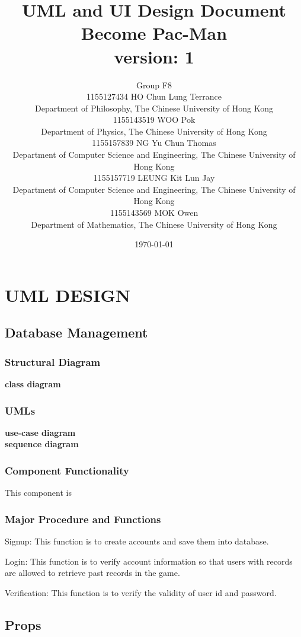 \documentclass[11pt]{article}
\title{UML and UI Design Document\\Become Pac-Man\\version: 1}
\author{Group F8\\1155127434 HO Chun Lung Terrance\\
Department of Philosophy, The Chinese University of Hong Kong\\1155143519 WOO Pok\\
Department of Physics, The Chinese University of Hong Kong\\1155157839 NG Yu Chun Thomas\\
Department of Computer Science and Engineering, The Chinese University of Hong Kong\\1155157719 LEUNG Kit Lun Jay\\
Department of Computer Science and Engineering, The Chinese University of Hong Kong\\1155143569 MOK Owen\\
Department of Mathematics, The Chinese University of Hong Kong}
\date{\today}
\begin{document}
\maketitle
\tableofcontents
\newpage
\section{UML DESIGN}

\subsection{Database Management}
\subsubsection{Structural Diagram}
\textbf{class diagram}\\
\subsubsection{UMLs}
\textbf{use-case diagram}\\
\textbf{sequence diagram}\\
\subsubsection{Component Functionality}
This component is 
\subsubsection{Major Procedure and Functions}
Signup: This function is to create accounts and save them into database.

Login: This function is to verify account information so that users with records are allowed to retrieve past records in the game.

Verification: This function is to verify the validity of user id and password.

\subsection{Props}
\end{document}
